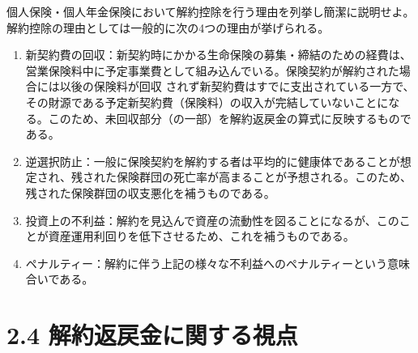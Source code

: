 \documentclass[report,gutter=10mm,fore-edge=10mm,uplatex,dvipdfmx]{jlreq}
\begin{document}
個人保険・個人年金保険において解約控除を行う理由を列挙し簡潔に説明せよ。
解約控除の理由としては一般的に次の4つの理由が挙げられる。
\begin{enumerate}
\item 新契約費の回収：新契約時にかかる生命保険の募集・締結のための経費は、営業保険料中に予定事業費として組み込んでいる。保険契約が解約された場合には以後の保険料が回収
  されず新契約費はすでに支出されている一方で、その財源である予定新契約費（保険料）の収入が完結していないことになる。このため、未回収部分（の一部）を解約返戻金の算式に反映するものである。
\item 逆選択防止：一般に保険契約を解約する者は平均的に健康体であることが想定され、残された保険群団の死亡率が高まることが予想される。このため、残された保険群団の収支悪化を補うものである。
\item 投資上の不利益：解約を見込んで資産の流動性を図ることになるが、このことが資産運用利回りを低下させるため、これを補うものである。
\item ペナルティー：解約に伴う上記の様々な不利益へのペナルティーという意味合いである。
\end{enumerate}


\section{2.4 解約返戻金に関する視点}
\end{document}
